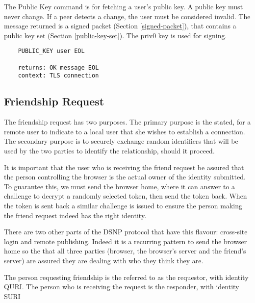 \documentclass[letterpaper,11pt,oneside]{article}
\begin{document}
The Public Key command is for fetching a user's public key. A public key must
never change. If a peer detects a change, the user must be considered invalid.
The message returned is a signed packet (Section \ref{signed-packet}), that
contains a public key set (Section \ref{public-key-set}). The priv0 key is used
for signing.

\vspace{10pt}
\begin{verbatim}
    PUBLIC_KEY user EOL

    returns: OK message EOL
    context: TLS connection
\end{verbatim}


\subsection{Friendship Request}

The friendship request has two purposes. The primary purpose is the stated, for
a remote user to indicate to a local user that she wishes to establish a
connection. The secondary purpose is to securely exchange random identifiers
that will be used by the two parties to identify the relationship, should it
proceed.

It is important that the user who is receiving the friend request be assured
that the person controlling the browser is the actual owner of the identity
submitted. To guarantee this, we must send the browser home, where it can
answer to a challenge to decrypt a randomly selected token, then send the token
back. When the token is sent back a similar challenge is issued to ensure the
person making the friend request indeed has the right identity.

There are two other parts of the DSNP protocol that have this flavour:
cross-site login and remote publishing. Indeed it is a recurring pattern to
send the browser home so the that all three parties (browser, the browser's
server and the friend's server) are assured they are dealing with who they
think they are.

The person requesting friendship is the referred to as the requestor, with
identity QURI. The person who is receiving the request is the responder, with
identity SURI
\end{document}
